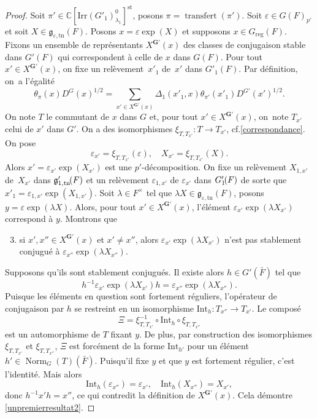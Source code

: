 \documentclass[11pt]{article}
\newcommand{\cf}{cf.\xspace}
\numberwithin{equation}{section}\providecommand{\og}{«\,}\providecommand{\fg}{\,»}
\let\epsilon\varepsilon
\newcommand{\frg}{\mathfrak{g}}
\newcommand{\Int}{\mathrm{Int}}
\newcommand{\Irr}{\mathrm{Irr}}
\newcommand{\reg}{\mathrm{reg}}
\newcommand{\st}{\mathrm{st}}
\newcommand{\tn}{\mathrm{tn}}
\DeclareMathOperator{\Norm}{Norm}
\DeclareMathOperator{\transfert}{transfert}
\newcommand{\bG}{\boldsymbol{G}}
\newcommand{\CC}{\mathbb{C}}
\theoremstyle{plain}
\theoremstyle{definition}
\begin{document}
\begin{proof}
Soit $\pi'\in \CC[\Irr(G'_{1})^0_{\lambda_{1}}]^{\st}$, posons $\pi=\transfert(\pi')$. Soit $\epsilon\in G(F)_{p'}$ et soit $X\in \frg_{\epsilon,\tn}(F)$. Posons $x=\epsilon \exp(X)$ et supposons $x\in G_{\reg}(F)$. Fixons un ensemble de représentants $X^{\bG'}(x)$ des classes de conjugaison stable dans $G'(F)$ qui correspondent à celle de $x$ dans $G(F)$. Pour tout $x'\in X^{\bG'}(x)$, on fixe un relèvement~$x'_{1}$ de~$x'$ dans $G'_{1}(F)$. Par définition, on~a l'égalité
\begin{equation}\tag{1}\label{unpremierresultat1}
\theta_{\pi}(x)D^G(x)^{1/2}=\sum_{x'\in X^{\bG'}(x)}\Delta_{1}(x'_{1},x)\theta_{\pi'}(x'_{1})D^{G'}(x')^{1/2}.
\end{equation}
On note $T$ le commutant de $x$ dans $G$ et, pour tout $x'\in X^{\bG'}(x)$, on~note $T_{x'}$ celui de $x'$ dans $G'$. On a des isomorphismes $\xi_{T,T_{x'}}:T\to T_{x'}$, \cf \ref{correspondance}. On pose
\[
\epsilon_{x'}=\xi_{T,T_{x'}}(\epsilon),\quad X_{x'}=\xi_{T,T_{x'}}(X).
\]
Alors $x'\!=\!\epsilon_{x'}\exp(X_{x'})$ est une $p'$-décomposition. On fixe un relèvement $X_{1,x'}$ de~$X_{x'}$ dans $\frg'_{1,\tn}\mkern-2.5mu(F)$ et un relèvement $\epsilon_{1,x'}$ de $\epsilon_{x'}$ dans $G'_{1}\mkern-2.5mu(F)$ de sorte que~\hbox{$x'_{1}\!\!=\!\epsilon_{1,x'}\exp(X_{1,x'})$}.
Soit $\lambda\in F^{\times}$ tel que $\lambda X\in \frg_{\epsilon,\tn}(F)$, posons $y=\epsilon \exp(\lambda X)$. Alors, pour tout $x'\in X^{\bG'}(x)$, l'élément $\epsilon_{x'}\exp(\lambda X_{x'})$ correspond à $ y$. Montrons que
\begin{enumerate}\setcounter{enumi}{2}
\item\label{unpremierresultat2}
si $x',x''\in X^{\bG'}(x)$ et $x'\neq x''$, alors $\epsilon_{x'}\exp(\lambda X_{x'})$ n'est pas stablement conjugué à $\epsilon_{x''}\exp(\lambda X_{x''})$.
\end{enumerate}

Supposons qu'ils sont stablement conjugués. Il existe alors $h\in G'(\bar{F})$ tel que
\[
h^{-1}\epsilon_{x'}\exp(\lambda X_{x'})h=\epsilon_{x''}\exp(\lambda X_{x''}).
\]
Puisque les éléments en question sont fortement réguliers, l'opérateur de conjugaison par $h$ se restreint en un isomorphisme $\Int_{h}:T_{x''}\to T_{x'}$. Le composé
\[
\Xi=\xi_{T,T_{x'}}^{-1}\circ \Int_{h}\circ\xi_{T,T_{x''}}
\]
est un automorphisme de $T$ fixant $y$. De plus, par construction des isomorphismes $\xi_{T,T_{x'}}$ et $\xi_{T,T_{x''}}$, $\Xi$ est forcément de la forme $\Int_{h'}$ pour un élément $h'\in \Norm_{G}(T)(\bar{F})$. Puisqu'il fixe $y$ et que $y$ est fortement régulier, c'est l'identité. Mais alors
\[
\Int_{h}(\epsilon_{x''})=\epsilon_{x'},\quad \Int_{h}(X_{x''})=X_{x'},
\]
donc $h^{-1}x'h=x''$, ce qui contredit la définition de $X^{\bG'}(x)$. Cela démontre \eqref{unpremierresultat2}.


\end{proof}
\end{document}
